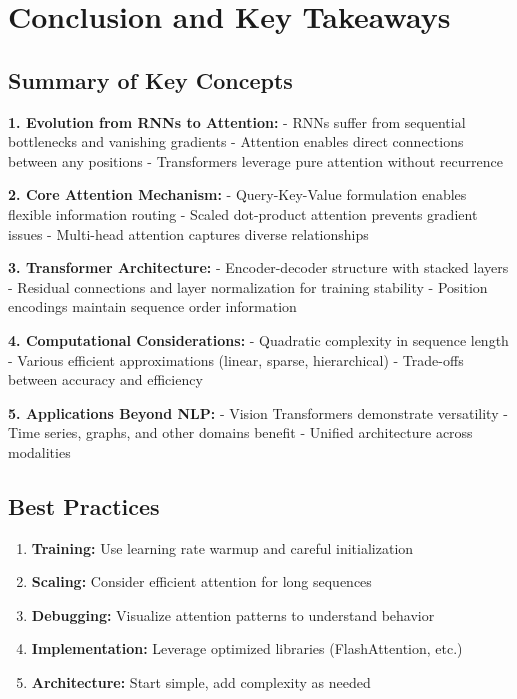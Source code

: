 \documentclass[11pt]{article}
\begin{document}
\section{Conclusion and Key Takeaways}

\subsection{Summary of Key Concepts}

\textbf{1. Evolution from RNNs to Attention:}
- RNNs suffer from sequential bottlenecks and vanishing gradients
- Attention enables direct connections between any positions
- Transformers leverage pure attention without recurrence

\textbf{2. Core Attention Mechanism:}
- Query-Key-Value formulation enables flexible information routing
- Scaled dot-product attention prevents gradient issues
- Multi-head attention captures diverse relationships

\textbf{3. Transformer Architecture:}
- Encoder-decoder structure with stacked layers
- Residual connections and layer normalization for training stability
- Position encodings maintain sequence order information

\textbf{4. Computational Considerations:}
- Quadratic complexity in sequence length
- Various efficient approximations (linear, sparse, hierarchical)
- Trade-offs between accuracy and efficiency

\textbf{5. Applications Beyond NLP:}
- Vision Transformers demonstrate versatility
- Time series, graphs, and other domains benefit
- Unified architecture across modalities

\subsection{Best Practices}

\begin{enumerate}
    \item \textbf{Training:} Use learning rate warmup and careful initialization
    \item \textbf{Scaling:} Consider efficient attention for long sequences
    \item \textbf{Debugging:} Visualize attention patterns to understand behavior
    \item \textbf{Implementation:} Leverage optimized libraries (FlashAttention, etc.)
    \item \textbf{Architecture:} Start simple, add complexity as needed
\end{enumerate}
\end{document}
